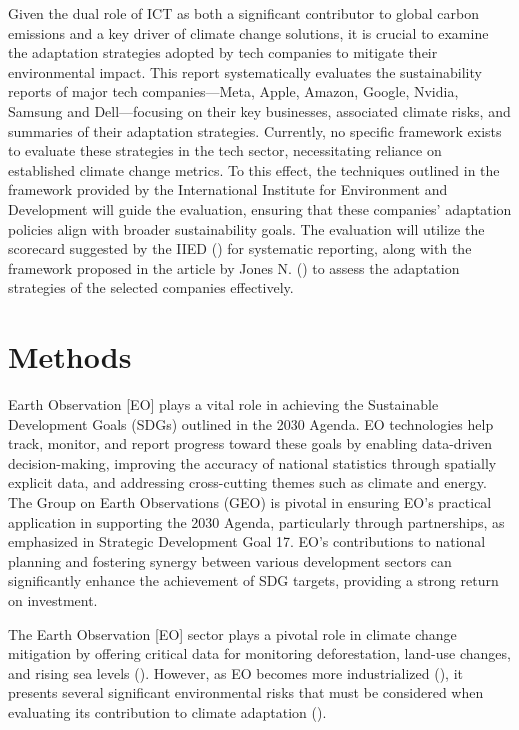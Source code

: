 \documentclass[12pt]{article}
\begin{document}
Given the dual role of ICT as both a significant contributor to global carbon emissions and a 
key driver of climate change solutions, it is crucial to examine the adaptation strategies 
adopted by tech companies to mitigate their environmental impact. This report systematically 
evaluates the sustainability reports of major tech companies—Meta, Apple, Amazon, Google, Nvidia, 
Samsung and Dell—focusing on their key businesses, associated climate risks, and summaries of 
their adaptation strategies. Currently, no specific 
framework exists to evaluate these strategies in the tech sector, necessitating reliance on established climate change 
metrics. To this effect, the techniques outlined in the framework provided by the International Institute for Environment and Development 
will guide the evaluation, ensuring that these companies’ adaptation policies align with broader sustainability goals. The evaluation will utilize 
the scorecard suggested by the IIED (\cite{craft_2016}) for systematic reporting, along with the framework proposed in the article by Jones N. (\cite{jones_2001}) 
to assess the adaptation strategies of the selected companies effectively.


\section*{Methods}
Earth Observation [EO] plays a vital role in achieving the Sustainable Development Goals (SDGs) outlined in the 2030 Agenda. EO technologies help track, monitor, and report progress toward these goals by enabling data-driven decision-making, improving the accuracy of national statistics through spatially explicit data, and addressing cross-cutting themes such as climate and energy. The Group on Earth Observations (GEO) is pivotal in ensuring EO's practical application in supporting the 2030 Agenda, particularly through partnerships, as emphasized in Strategic Development Goal 17. EO's contributions to national planning and fostering synergy between various development sectors can significantly enhance the achievement of SDG targets, providing a strong return on investment.

The Earth Observation [EO] sector plays a pivotal role in climate change mitigation by offering critical 
data for monitoring deforestation, land-use changes, and rising sea levels (\cite{anderson_2017}). However, as EO becomes more industrialized (\cite{venkatesan_2020}), 
it presents several significant environmental risks that must be considered when evaluating its contribution to climate adaptation (\cite{crisp_2020}).
\end{document}
